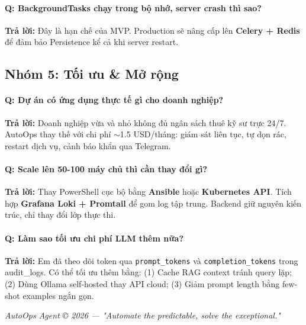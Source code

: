 \documentclass[12pt,a4paper]{article}
\begin{document}
\paragraph{Q: BackgroundTasks chạy trong bộ nhớ, server crash thì sao?}
\textbf{Trả lời:} Đây là hạn chế của MVP. Production sẽ nâng cấp lên \textbf{Celery + Redis} để đảm bảo Persistence kể cả khi server restart.

\subsection{Nhóm 5: Tối ưu \& Mở rộng}

\paragraph{Q: Dự án có ứng dụng thực tế gì cho doanh nghiệp?}
\textbf{Trả lời:} Doanh nghiệp vừa và nhỏ không đủ ngân sách thuê kỹ sư trực 24/7. AutoOps thay thế với chi phí $\sim$1.5 USD/tháng: giám sát liên tục, tự dọn rác, restart dịch vụ, cảnh báo khẩn qua Telegram.

\paragraph{Q: Scale lên 50-100 máy chủ thì cần thay đổi gì?}
\textbf{Trả lời:} Thay PowerShell cục bộ bằng \textbf{Ansible} hoặc \textbf{Kubernetes API}. Tích hợp \textbf{Grafana Loki + Promtail} để gom log tập trung. Backend giữ nguyên kiến trúc, chỉ thay đổi lớp thực thi.

\paragraph{Q: Làm sao tối ưu chi phí LLM thêm nữa?}
\textbf{Trả lời:} Em đã theo dõi token qua \texttt{prompt\_tokens} và \texttt{completion\_tokens} trong audit\_logs. Có thể tối ưu thêm bằng: (1) Cache RAG context tránh query lặp; (2) Dùng Ollama self-hosted thay API cloud; (3) Giảm prompt length bằng few-shot examples ngắn gọn.

\vspace{1.5cm}
\begin{center}
    \textit{AutoOps Agent © 2026 — "Automate the predictable, solve the exceptional."}
\end{center}
\end{document}
